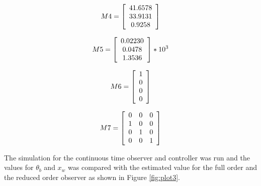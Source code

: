 \documentclass[11pt]{article}
\begin{document}
\begin{par}
$$M4=\left\lbrack \begin{array}{c}\linebreak 
41. 6578\\\linebreak 
33. 9131\\\linebreak
0. 9258\linebreak 
\end{array}\right\rbrack$$


$$M5=\left\lbrack \begin{array}{cc}\linebreak 
0. 02230 \\\linebreak 
0. 0478 \\\linebreak 
1. 3536 \linebreak 
\end{array}\right\rbrack *{10}^3$$




$$M6=\left\lbrack \begin{array}{cc}\linebreak 
1 \\\linebreak 
0 \\\linebreak
0 \\\linebreak
0 \linebreak 
\end{array}\right\rbrack $$


$$M7=\left\lbrack \begin{array}{ccc}\linebreak 
0 & 0 & 0\\\linebreak 
1 & 0 & 0\\\linebreak 
0 & 1 & 0\\\linebreak 
0 & 0 & 1\linebreak 
\end{array}\right\rbrack$$
\newline

The simulation for the continuous time observer and controller was run and the values for $\theta_b$ and $x_w$ was compared with the estimated value for the full order and the reduced order observer as shown in Figure \ref{fig:plot3}.


\end{par}
\end{document}
